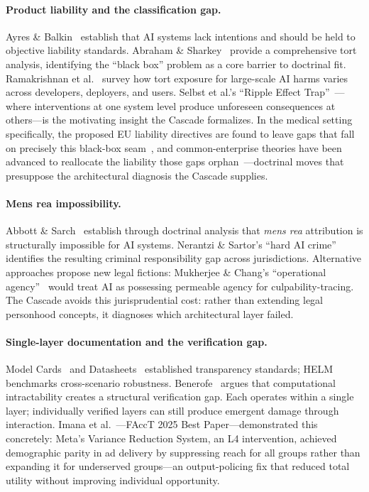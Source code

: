 \paragraph{Product liability and the classification gap.} Ayres \& Balkin~\cite{ayres2024risky} establish that AI systems lack intentions and should be held to objective liability standards. Abraham \& Sharkey~\cite{abraham2026untangling} provide a comprehensive tort analysis, identifying the ``black box'' problem as a core barrier to doctrinal fit. Ramakrishnan et al.~\cite{ramakrishnan2024tortai} survey how tort exposure for large-scale AI harms varies across developers, deployers, and users. Selbst et al.'s ``Ripple Effect Trap''~\cite{selbst2019fairness}---where interventions at one system level produce unforeseen consequences at others---is the motivating insight the Cascade formalizes. In the medical setting specifically, the proposed EU liability directives are found to leave gaps that fall on precisely this black-box seam~\cite{duffourc2023}, and common-enterprise theories have been advanced to reallocate the liability those gaps orphan~\cite{chan2021}---doctrinal moves that presuppose the architectural diagnosis the Cascade supplies.

\paragraph{Mens rea impossibility.} Abbott \& Sarch~\cite{abbott2020punishing} establish through doctrinal analysis that \textit{mens rea} attribution is structurally impossible for AI systems. Nerantzi \& Sartor's ``hard AI crime''~\cite{nerantzi2024hardai} identifies the resulting criminal responsibility gap across jurisdictions. Alternative approaches propose new legal fictions: Mukherjee \& Chang's ``operational agency''~\cite{mukherjee2026operational} would treat AI as possessing permeable agency for culpability-tracing. The Cascade avoids this jurisprudential cost: rather than extending legal personhood concepts, it diagnoses which architectural layer failed.

\paragraph{Single-layer documentation and the verification gap.} Model Cards~\cite{mitchell2019model} and Datasheets~\cite{gebru2021datasheets} established transparency standards; HELM~\cite{liang2023holistic} benchmarks cross-scenario robustness. Benerofe~\cite{benerofe2025verification} argues that computational intractability creates a structural verification gap. Each operates within a single layer; individually verified layers can still produce emergent damage through interaction. Imana et al.~\cite{imana2025meta}---FAccT 2025 Best Paper---demonstrated this concretely: Meta's Variance Reduction System, an L4 intervention, achieved demographic parity in ad delivery by suppressing reach for all groups rather than expanding it for underserved groups---an output-policing fix that reduced total utility without improving individual opportunity.

